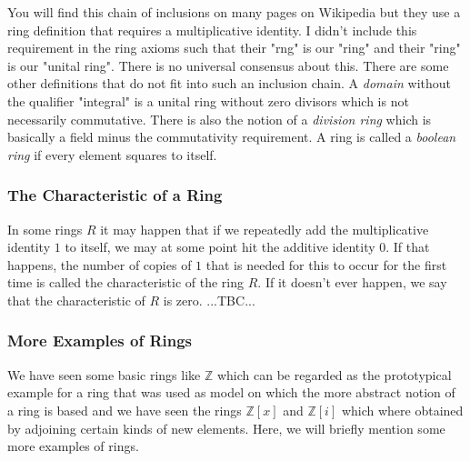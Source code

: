 You will find this chain of inclusions on many pages on Wikipedia but they use a ring definition that requires a multiplicative identity. I didn't include this requirement in the ring axioms such that their "rng" is our "ring" and their "ring" is our "unital ring". There is no universal consensus about this. There are some other definitions that do not fit into such an inclusion chain. A \emph{domain} without the qualifier "integral" is a unital ring without zero divisors which is not necessarily commutative. There is also the notion of a \emph{division ring} which is basically a field minus the commutativity requirement. A ring is called a \emph{boolean ring} if every element squares to itself. 

%
%



% 


\subsubsection{The Characteristic of a Ring}
In some rings $R$ it may happen that if we repeatedly add the multiplicative identity $1$ to itself, we may at some point hit the additive identity $0$. If that happens, the number of copies of $1$ that is needed for this to occur for the first time is called the characteristic of the ring $R$. If it doesn't ever happen, we say that the characteristic of $R$ is zero. ...TBC...




\subsubsection{More Examples of Rings}
We have seen some basic rings like $\mathbb{Z}$ which can be regarded as the prototypical example for a ring that was used as model on which the more abstract notion of a ring is based and we have seen the rings $\mathbb{Z}[x]$ and $\mathbb{Z}[i]$ which where obtained by adjoining certain kinds of new elements. Here, we will briefly mention some more examples of rings.

